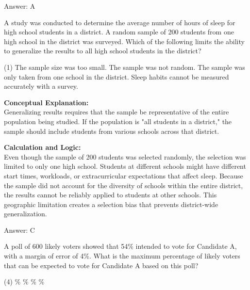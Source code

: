 \documentclass[11pt,paper=a4,answers]{exam}
\begin{document}
\begin{questions}
\begin{solution}
\vspace{30pt}

Answer: \colorbox{yellow!100}{A}
\end{solution}

\vspace{60pt}

\question
A study was conducted to determine the average number of hours of sleep for high school students in a district. A random sample of 200 students from one high school in the district was surveyed. Which of the following limits the ability to generalize the results to all high school students in the district?
\begin{tasks}(1)
    \task The sample size was too small.
    \task The sample was not random.
    \task The sample was only taken from one school in the district.
    \task Sleep habits cannot be measured accurately with a survey.
\end{tasks}

\begin{solution}
\textbf{Conceptual Explanation:} \\
Generalizing results requires that the sample be representative of the entire population being studied. If the population is "all students in a district," the sample should include students from various schools across that district.

\vspace{30pt}

\textbf{Calculation and Logic:} \\
Even though the sample of 200 students was selected randomly, the selection was limited to only one high school. Students at different schools might have different start times, workloads, or extracurricular expectations that affect sleep. Because the sample did not account for the diversity of schools within the entire district, the results cannot be reliably applied to students at other schools. This geographic limitation creates a selection bias that prevents district-wide generalization.

\vspace{30pt}

Answer: \colorbox{yellow!100}{C}
\end{solution}

\vspace{60pt}

\question
A poll of 600 likely voters showed that 54\% intended to vote for Candidate A, with a margin of error of 4\%. What is the maximum percentage of likely voters that can be expected to vote for Candidate A based on this poll?
\begin{tasks}(4)
    \%
    \%
    \%
    \%
\end{tasks}


\end{questions}
\end{document}
